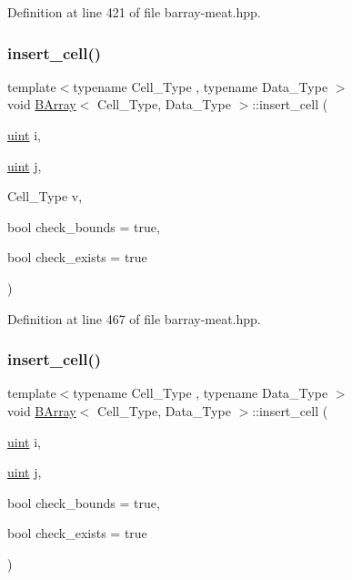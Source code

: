 Definition at line 421 of file barray-\/meat.\+hpp.

\mbox{\label{class_b_array_aa7268761d977833b688123d161d17d1b}} 
\subsubsection{\texorpdfstring{insert\+\_\+cell()}{insert\_cell()}\hspace{0.1cm}{\footnotesize\ttfamily [2/10]}}
{\footnotesize\ttfamily template$<$typename Cell\+\_\+\+Type , typename Data\+\_\+\+Type $>$ \\
void \hyperlink{class_b_array}{B\+Array}$<$ Cell\+\_\+\+Type, Data\+\_\+\+Type $>$\+::insert\+\_\+cell (\begin{DoxyParamCaption}\item[{\hyperlink{typedefs_8hpp_a91ad9478d81a7aaf2593e8d9c3d06a14}{uint}}]{i,  }\item[{\hyperlink{typedefs_8hpp_a91ad9478d81a7aaf2593e8d9c3d06a14}{uint}}]{j,  }\item[{Cell\+\_\+\+Type}]{v,  }\item[{bool}]{check\+\_\+bounds = {\ttfamily true},  }\item[{bool}]{check\+\_\+exists = {\ttfamily true} }\end{DoxyParamCaption})\hspace{0.3cm}{\ttfamily [inline]}}



Definition at line 467 of file barray-\/meat.\+hpp.

\mbox{\label{class_b_array_a4deb6afa6040603fc4fb5a90eef90761}} 
\subsubsection{\texorpdfstring{insert\+\_\+cell()}{insert\_cell()}\hspace{0.1cm}{\footnotesize\ttfamily [3/10]}}
{\footnotesize\ttfamily template$<$typename Cell\+\_\+\+Type , typename Data\+\_\+\+Type $>$ \\
void \hyperlink{class_b_array}{B\+Array}$<$ Cell\+\_\+\+Type, Data\+\_\+\+Type $>$\+::insert\+\_\+cell (\begin{DoxyParamCaption}\item[{\hyperlink{typedefs_8hpp_a91ad9478d81a7aaf2593e8d9c3d06a14}{uint}}]{i,  }\item[{\hyperlink{typedefs_8hpp_a91ad9478d81a7aaf2593e8d9c3d06a14}{uint}}]{j,  }\item[{bool}]{check\+\_\+bounds = {\ttfamily true},  }\item[{bool}]{check\+\_\+exists = {\ttfamily true} }\end{DoxyParamCaption})\hspace{0.3cm}{\ttfamily [inline]}}




